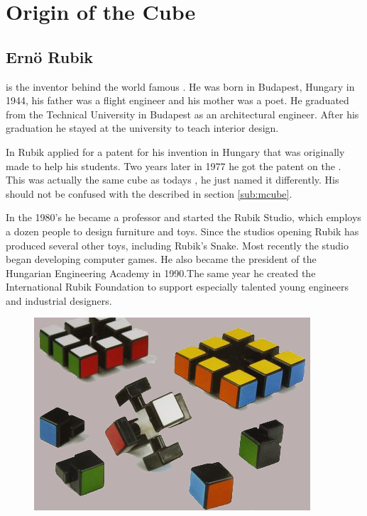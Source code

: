 \chapter{Origin of the Cube}

\section{Ern\"{o} Rubik}
\erno{} is the inventor behind the world famous \rubik{}. He was born in Budapest, Hungary in 1944, his father was a flight engineer and his mother was a poet. He graduated from the Technical University in Budapest as an architectural engineer. After his graduation he stayed at the university to teach interior design.

In  Rubik applied for a patent for his invention in Hungary that was originally made to help his students. Two years later in 1977 he got the patent on the \mcube{}. This \mcube{} was actually the same cube as todays \rubik{}, he just named it differently. His \mcube{} should not be confused with the \mcube{} described in section \ref{sub:mcube}.

In the 1980's he became a professor and started the Rubik Studio, which employs a dozen people to design furniture and toys. 
Since the studios opening Rubik has produced several other toys, including Rubik's Snake. Most recently  the studio began developing computer games. 
He also became the president of the Hungarian Engineering Academy in 1990.The same year he created the International Rubik Foundation to support especially talented young engineers and industrial designers.

\begin{figure}
	\centering
		\includegraphics[scale=0.6]{input/pics/rubiks-cube.png}
	\caption{}
	\label{fig:rubiks-cube}
\end{figure}
 
